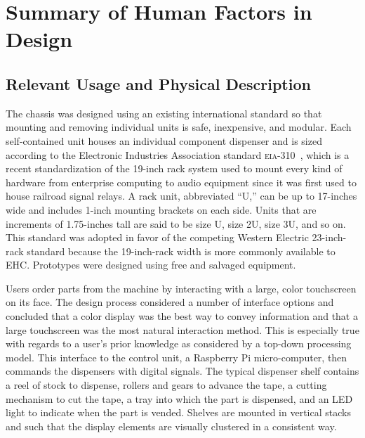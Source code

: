 \documentclass[12pt,oneside,final]{article}
\begin{document}
\pagebreak
\section{Summary of Human Factors in Design}
\label{sec:hf}

\subsection{Relevant Usage and Physical Description}
The chassis was designed using an existing international standard so that mounting and removing individual units is safe, inexpensive, and modular. Each self-contained unit houses an individual component dispenser and is sized according to the Electronic Industries Association standard \textsc{eia-310}~\cite{eia-310}, which is a recent standardization of the 19-inch rack system used to mount every kind of hardware from enterprise computing to audio equipment since it was first used to house railroad signal relays. A rack unit, abbreviated ``U,'' can be up to 17-inches wide and includes 1-inch mounting brackets on each side. Units that are increments of 1.75-inches tall are said to be size U, size 2U, size 3U, and so on. This standard was adopted in favor of the competing Western Electric 23-inch-rack standard because the 19-inch-rack width is more commonly available to EHC. Prototypes were designed using free and salvaged equipment.

Users order parts from the machine by interacting with a large, color touchscreen on its face. The design process considered a number of interface options and concluded that a color display was the best way to convey information and that a large touchscreen was the most natural interaction method. This is especially true with regards to a user's prior knowledge as considered by a top-down processing model. This interface to the control unit, a Raspberry Pi micro-computer, then commands the dispensers with digital signals. The typical dispenser shelf contains a reel of stock to dispense, rollers and gears to advance the tape, a cutting mechanism to cut the tape, a tray into which the part is dispensed, and an LED light to indicate when the part is vended. Shelves are mounted in vertical stacks and such that the display elements are visually clustered in a consistent way.
\end{document}
